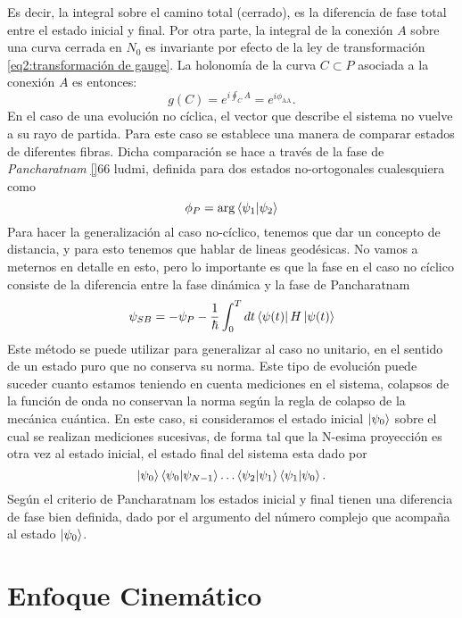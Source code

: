 Es decir, la integral sobre el camino total (cerrado), es la diferencia de fase total entre el estado inicial y final. Por otra parte, la integral de la conexión \( A \) sobre una curva cerrada en \( N_0 \) es invariante por efecto de la ley de transformación \ref{eq2:transformación de gauge}. La holonomía de la curva \( C \subset P \) asociada a la conexión \( A \) es entonces:
\begin{equation}
g(C) = e^{i \oint_C A} = e^{i\phi_{\text{AA}}}.
\end{equation}
En el caso de una evolución no cíclica, el vector que describe el sistema no vuelve a su rayo de partida. Para este caso se establece una manera de comparar estados de diferentes fibras. Dicha comparación se hace a través de la fase de \textit{Pancharatnam} \ref{}66 ludmi, definida para dos estados no-ortogonales cualesquiera como
\begin{equation}
    \phi_P = \arg \braket{\psi_1}{\psi_2}
\end{equation}
Para hacer la generalización al caso no-cíclico, tenemos que dar un concepto de distancia, y para esto tenemos que hablar de lineas geodésicas. No vamos a meternos en detalle en esto, pero lo importante es que la fase en el caso no cíclico consiste de la diferencia entre la fase dinámica y la fase de Pancharatnam
\begin{equation}
    \psi_{SB}=-\psi_P-\frac{1}{\hbar}\int_0^Tdt\bra{\psi(t)}H\ket{\psi(t)}
\end{equation}
Este método se puede utilizar para generalizar al caso no unitario, en el sentido de un estado puro que no conserva su norma. Este tipo de evolución puede suceder cuanto estamos teniendo en cuenta mediciones en el sistema, colapsos de la función de onda no conservan la norma según la regla de colapso de la mecánica cuántica. En este caso, si consideramos el estado inicial $\ket{\psi_0}$ sobre el cual se realizan mediciones sucesivas, de forma tal que la N-esima proyección es otra vez al estado inicial, el estado final del sistema esta dado por
\begin{equation}
    \ket{\psi_0}\braket{\psi_0}{\psi_{N-1}}\dots\braket{\psi_2}{\psi_1}\braket{\psi_1}{\psi_0}.
\end{equation}
Según el criterio de Pancharatnam los estados inicial y final tienen una diferencia de fase bien definida, dado por el argumento del número complejo que acompaña al estado $\ket{\psi_0}$.


\section{Enfoque Cinemático}\label{sec2:cinematico}

